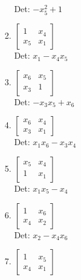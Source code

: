 \documentclass[12pt]{article}
\begin{document}
\begin{enumerate}
\begin{enumerate}
\begin{enumerate}
Det: $- x_{5}^{2} + 1$\\


\item $\displaystyle \left[\begin{matrix}1 & x_{4}\\x_{5} & x_{1}\end{matrix}\right]$\\

Det: $x_{1} - x_{4} x_{5}$\\


\item $\displaystyle \left[\begin{matrix}x_{6} & x_{5}\\x_{3} & 1\end{matrix}\right]$\\

Det: $- x_{3} x_{5} + x_{6}$\\


\item $\displaystyle \left[\begin{matrix}x_{6} & x_{4}\\x_{3} & x_{1}\end{matrix}\right]$\\

Det: $x_{1} x_{6} - x_{3} x_{4}$\\


\item $\displaystyle \left[\begin{matrix}x_{5} & x_{4}\\1 & x_{1}\end{matrix}\right]$\\

Det: $x_{1} x_{5} - x_{4}$\\


\item $\displaystyle \left[\begin{matrix}1 & x_{6}\\x_{4} & x_{2}\end{matrix}\right]$\\

Det: $x_{2} - x_{4} x_{6}$\\


\item $\displaystyle \left[\begin{matrix}1 & x_{5}\\x_{4} & x_{1}\end{matrix}\right]$\\


\end{enumerate}
\end{enumerate}
\end{enumerate}
\end{document}
